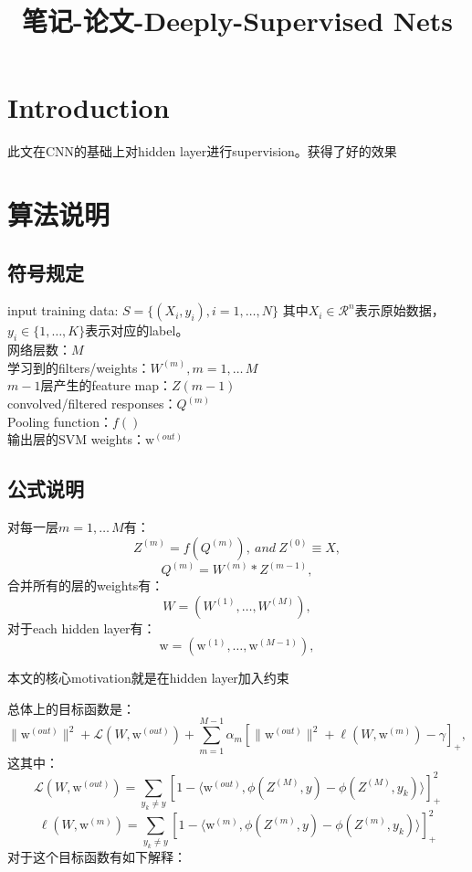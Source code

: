 \documentclass{article}
\begin{document}
\begin{CJK}{UTF8}{gbsn}

\title{笔记-论文-Deeply-Supervised Nets}
\maketitle
\section{Introduction}
此文在CNN的基础上对hidden layer进行supervision。获得了好的效果 
\section{算法说明}
\subsection{符号规定}
input training data: 
$S=\{(X_i,y_i),i=1,\dots,N\}$ 其中$X_i\in\mathcal{R}^n$表示原始数据，$y_i\in\{1,\dots,K\}$表示对应的label。\\
网络层数：$M$ \\
学习到的filters/weights：$W^{(m)},m=1,\dots\,M$ \\
$m-1$层产生的feature map：$Z{(m-1)}$ \\
convolved/filtered responses：$Q^{(m)}$ \\
Pooling function：$f()$ \\
输出层的SVM weights：$\mathrm{w}^{(out)}$
\subsection{公式说明}
对每一层$m=1,\dots\,M$有：
\begin{equation} Z^{(m)}=f(Q^{(m)}),~and~Z^{(0)}\equiv X, \end{equation}
\begin{equation} Q^{(m)}=W^{(m)}\ast Z^{(m-1)}, \end{equation}
合并所有的层的weights有：
$$W=(W^{(1)},\dots,W^{(M)}),$$
对于each hidden layer有：
$$\mathrm{w}=(\mathrm{w}^{(1)},\dots,\mathrm{w}^{(M-1)}),$$


本文的核心motivation就是在hidden layer加入约束


总体上的目标函数是：
\begin{equation}
 \|\mathrm{w}^{(out)}\|^2+\mathcal{L}(W,\mathrm{w}^{(out)})+\sum^{M-1}_{m=1}\alpha_m\left[\|\mathrm{w}^{(out)}\|^2+\ell(W,\mathrm{w}^{(m)})-\gamma\right]_+, \end{equation}
这其中：
\begin{equation} 
\mathcal{L}(W,\mathrm{w}^{(out)})=\sum_{y_k\neq y}\left[1-\langle\mathrm{w}^{(out)},\phi(Z^{(M)},y)-\phi(Z^{(M)},y_k)\rangle\right]^2_+
\end{equation}
\begin{equation} 
\ell(W,\mathrm{w}^{(m)})=\sum_{y_k\neq y}\left[1-\langle\mathrm{w}^{(m)},\phi(Z^{(m)},y)-\phi(Z^{(m)},y_k)\rangle\right]^2_+
\end{equation}
对于这个目标函数有如下解释：
\end{CJK}
\end{document}
